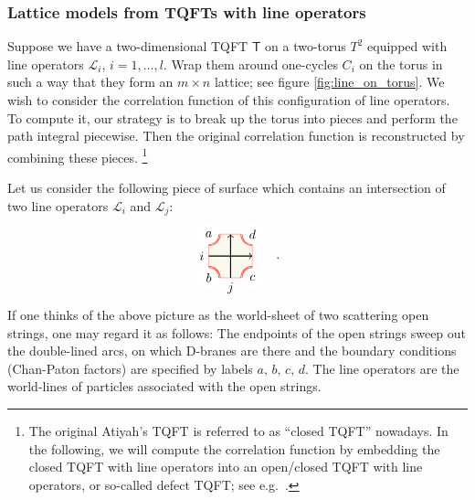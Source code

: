 \subsubsection{Lattice models from TQFTs with line operators}

Suppose we have a two-dimensional TQFT $\mathsf{T}$ on a two-torus
$T^{2}$ equipped with line operators $\mathcal{L}_{i}$, $i=1,\ldots,l$.
Wrap them around one-cycles $C_{i}$ on the torus in such a way that
they form an $m\times n$ lattice; see figure \ref{fig:line_on_torus}. We wish to consider the correlation
function of this configuration of line operators. To compute it, our
strategy is to break up the torus into pieces and perform
the path integral piecewise. Then the original correlation function
is reconstructed by combining these pieces.%
%
\footnote{The original Atiyah's TQFT is referred to as ``closed TQFT'' nowadays.
In the following, we will compute the correlation function by embedding
the closed TQFT with line operators into an open/closed TQFT with
line operators, or so-called defect TQFT; see e.g.~\cite{Lazaroiu:2000rk,Moore:2006dw,Carqueville:2016nqk}.}
%


Let us consider the following piece of surface which contains an intersection
of two line operators $\mathcal{L}_{i}$ and $\mathcal{L}_{j}$:
\begin{equation}
  \label{eq:piece_of_lines}
    \begin{tikzpicture}[scale=0.6, baseline=(x.base)]
        \node (x) at (0,0) {\vphantom{x}};

        \draw[color=red!50, fill=olive!5] (-1,-1) rectangle (1,1);

        \fill[color=white] (-1,1) circle (0.5);  \node (a) at (-1,1) {$a$};
        \draw[draw=red, double]  (-1,0.5) arc (-90:0:0.5);
        \fill[color=white] (-1,-1) circle (0.5);  \node (b) at (-1,-1) {$b$};
        \draw[draw=red, double]  (-1,-0.5) arc (90:0:0.5);
        \fill[color=white] (1,-1) circle (0.5);  \node (c) at (1,-1) {$c$};
        \draw[draw=red, double]  (1,-0.5) arc (90:180:0.5);
        \fill[color=white] (1,1) circle (0.5);  \node (d) at (1,1) {$d$};
        \draw[draw=red, double]  (1,0.5) arc (-90:-180:0.5);

        \draw[thick, ->] (-1,0) node[left] {$i$} -- (1,0);
        \draw[thick, ->] (0,-1) node[below] {$j$} -- (0,1);

    \end{tikzpicture}
  \quad .
\end{equation}
If one thinks of the above picture as the world-sheet of two scattering
open strings, one may regard it as follows: The endpoints
of the open strings sweep out the double-lined arcs, on which D-branes
are there and the boundary conditions (Chan-Paton factors) are specified
by labels $a,\,b,\,c,\,d$. The line operators are the world-lines
of particles associated with the open strings.


